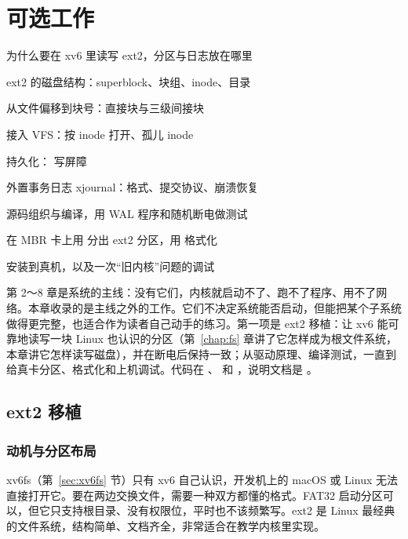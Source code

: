 \chapter{可选工作}
\label{chap:optional}

\begin{introduction}[本章内容]
  \item 为什么要在 xv6 里读写 ext2，分区与日志放在哪里
  \item ext2 的磁盘结构：superblock、块组、inode、目录
  \item 从文件偏移到块号：直接块与三级间接块
  \item 接入 VFS：按 inode 打开、孤儿 inode
  \item 持久化： 写屏障
  \item 外置事务日志 xjournal：格式、提交协议、崩溃恢复
  \item 源码组织与编译，用 WAL 程序和随机断电做测试
  \item 在 MBR 卡上用  分出 ext2 分区，用  格式化
  \item 安装到真机，以及一次“旧内核”问题的调试
\end{introduction}

第 2～8 章是系统的主线：没有它们，内核就启动不了、跑不了程序、用不了网络。本章收录的是主线之外的工作。它们不决定系统能否启动，但能把某个子系统做得更完整，也适合作为读者自己动手的练习。第一项是 ext2 移植：让 xv6 能可靠地读写一块 Linux 也认识的分区（第~\ref{chap:fs} 章讲了它怎样成为根文件系统，本章讲它怎样读写磁盘），并在断电后保持一致；从驱动原理、编译测试，一直到给真卡分区、格式化和上机调试。代码在 、 和 ，说明文档是 。

\section{ext2 移植}
\label{sec:ext2}

\subsection{动机与分区布局}

xv6fs（第~\ref{sec:xv6fs} 节）只有 xv6 自己认识，开发机上的 macOS 或 Linux 无法直接打开它。要在两边交换文件，需要一种双方都懂的格式。FAT32 启动分区可以，但它只支持根目录、没有权限位，平时也不该频繁写。ext2 是 Linux 最经典的文件系统，结构简单、文档齐全，非常适合在教学内核里实现。

